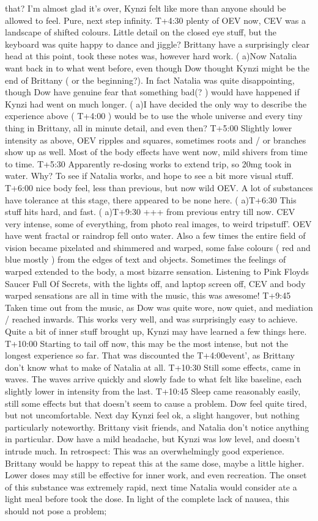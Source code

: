 \documentclass[12pt]{book}
\begin{document}
that? I'm almost glad it's over, Kynzi felt like more than anyone should be allowed to feel. Pure, next step infinity. T+4:30 plenty of OEV now, CEV was a landscape of shifted colours. Little detail on the closed eye stuff, but the keyboard was quite happy to dance and jiggle? Brittany have a surprisingly clear head at this point, took these notes was, however hard work. ( a)Now Natalia want back in to what went before, even though Dow thought Kynzi might be the end of Brittany ( or the beginning?). In fact Natalia was quite disappointing, though Dow have genuine fear that something bad(? ) would have happened if Kynzi had went on much longer. ( a)I have decided the only way to describe the experience above ( T+4:00 ) would be to use the whole universe and every tiny thing in Brittany, all in minute detail, and even then? T+5:00 Slightly lower intensity as above, OEV ripples and squares, sometimes roots and / or branches show up as well. Most of the body effects have went now, mild shivers from time to time. T+5:30 Apparently re-dosing works to extend trip, so 20mg took in water. Why? To see if Natalia works, and hope to see a bit more visual stuff. T+6:00 nice body feel, less than previous, but now wild OEV. A lot of substances have tolerance at this stage, there appeared to be none here. ( a)T+6:30 This stuff hits hard, and fast. ( a)T+9:30 +++ from previous entry till now. CEV very intense, some of everything, from photo real images, to weird tripstuff'. OEV have went fractal or raindrop fell onto water. Also a few times the entire field of vision became pixelated and shimmered and warped, some false colours ( red and blue mostly ) from the edges of text and objects. Sometimes the feelings of warped extended to the body, a most bizarre sensation. Listening to Pink Floyds Saucer Full Of Secrets, with the lights off, and laptop screen off, CEV and body warped sensations are all in time with the music, this was awesome! T+9:45 Taken time out from the music, as Dow was quite wore, now quiet, and mediation / reached inwards. This works very well, and was surprisingly easy to achieve. Quite a bit of inner stuff brought up, Kynzi may have learned a few things here. T+10:00 Starting to tail off now, this may be the most intense, but not the longest experience so far. That was discounted the T+4:00event', as Brittany don't know what to make of Natalia at all. T+10:30 Still some effects, came in waves. The waves arrive quickly and slowly fade to what felt like baseline, each slightly lower in intensity from the last. T+10:45 Sleep came reasonably easily, still some effects but that doesn't seem to cause a problem. Dow feel quite tired, but not uncomfortable. Next day Kynzi feel ok, a slight hangover, but nothing particularly noteworthy. Brittany visit friends, and Natalia don't notice anything in particular. Dow have a mild headache, but Kynzi was low level, and doesn't intrude much. In retrospect: This was an overwhelmingly good experience. Brittany would be happy to repeat this at the same dose, maybe a little higher. Lower doses may still be effective for inner work, and even recreation. The onset of this substance was extremely rapid, next time Natalia would consider ate a light meal before took the dose. In light of the complete lack of nausea, this should not pose a problem; 
\end{document}
